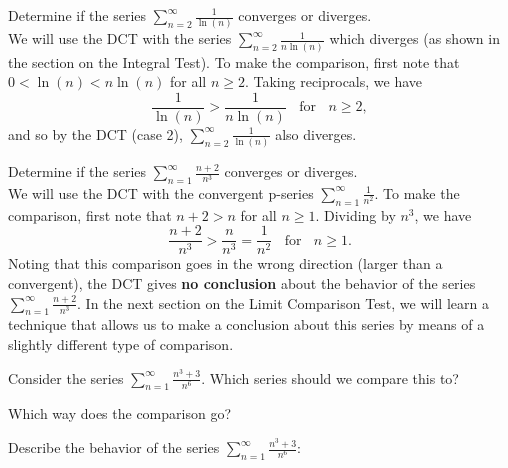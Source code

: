 \documentclass{ximera}
\begin{document}
\begin{example}[Divergence] %
Determine if the series $\sum_{n=2}^\infty \frac{1}{\ln(n)}$ converges or diverges.\\
We will use the DCT with the series $\sum_{n=2}^\infty \frac{1}{n\ln(n)}$ which diverges (as shown in the section on the Integral Test).
To make the comparison, first note that $0 < \ln(n) < n\ln(n)$ for all $n \geq 2$. Taking reciprocals, we have 
\[
\frac{1}{\ln(n)} > \frac{1}{n\ln(n)}  \;\; \text{ for } \;\; n \geq 2,
\]
and so by the DCT (case 2), $\sum_{n=2}^\infty \frac{1}{\ln(n)}$ also diverges.
\end{example}


\begin{example}[No Conclusion] %
Determine if the series $\sum_{n=1}^\infty \frac{n+2}{n^3}$ converges or diverges.\\
We will use the DCT with the convergent p-series $\sum_{n=1}^\infty \frac{1}{n^2}$. 
To make the comparison, first note that $ n+2 > n$ for all $n \geq 1$. Dividing by $n^3$,
we have 
\[
\frac{n+2}{n^3} > \frac{n}{n^3} = \frac{1}{n^2} \; \; \text{ for } \; \; n \geq 1.
\]
Noting that this comparison goes in the wrong direction (larger than a convergent), the DCT gives \textbf{no conclusion}
about the behavior of the series $\sum_{n=1}^\infty \frac{n+2}{n^3}$. In the next section on the Limit Comparison Test, 
we will learn a technique that allows us to make a conclusion about this series by means of a slightly different type of comparison.
\end{example}



\begin{problem}
Consider the series $\sum_{n=1}^\infty \frac{n^3 +3}{n^6}$.
Which series should we compare this to?

\begin{multipleChoice}
\end{multipleChoice}

Which way does the comparison go?
\begin{multipleChoice}
\end{multipleChoice}

Describe the behavior of the series $\sum_{n=1}^\infty \frac{n^3+3}{n^6}:$
\begin{multipleChoice}
\end{multipleChoice}

\end{problem}
\end{document}

